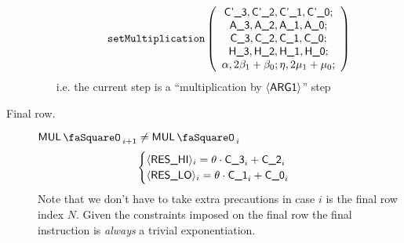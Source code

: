 \begin{description}
\begin{enumerate}
		\[
			\texttt{setMultiplication}
			\left(
			\begin{array}{c}
			\textsf{C'\_3}, \textsf{C'\_2}, \textsf{C'\_1}, \textsf{C'\_0}; \\
			\textsf{A\_3}, \textsf{A\_2}, \textsf{A\_1}, \textsf{A\_0}; \\
			\textsf{C\_3}, \textsf{C\_2}, \textsf{C\_1}, \textsf{C\_0}; \\
			\textsf{H\_3}, \textsf{H\_2}, \textsf{H\_1}, \textsf{H\_0}; \\
			\alpha, 2\beta_{1} + \beta_{0};
			\eta, 2\mu_{1} + \mu_{0}; \\
			\end{array}
			\right)
		\]
		i.e. the current step is a ``multiplication by $\langle{}\textsf{ARG}\textsf{1}\rangle{}$'' step
	\end{enumerate}
	\item[Final row.] %
	\If $\mulStamp_{i + 1} \neq \mulStamp_{i}$ \Then
	\[
	\begin{cases}
		\langle{}\textsf{RES}\textsf{\_HI}\rangle{}_{i} = \theta \cdot \textsf{C\_3}_{i} + \textsf{C\_2}_{i} \\
		\langle{}\textsf{RES}\textsf{\_LO}\rangle{}_{i} = \theta \cdot \textsf{C\_1}_{i} + \textsf{C\_0}_{i} \\
	\end{cases}
	\]
	Note that we don't have to take extra precautions in case $i$ is the final row index $N$. Given the constraints imposed on the final row the final instruction is \emph{always} a trivial exponentiation.
\end{description}
